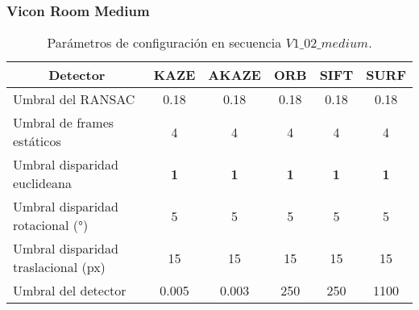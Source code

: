 \subsubsection{Vicon Room Medium}


\begin{table}[H]
	\caption{Parámetros de configuración  en secuencia $V1\_ 02\_ medium$.}
	\begin{tabular}{|l|c|c|c|c|c|}
		\hline
		\multicolumn{1}{|c|}{\textbf{Detector}} & \textbf{KAZE} & \textbf{AKAZE} & \textbf{ORB} & \textbf{SIFT} & \textbf{SURF} \\ \hline
		Umbral del RANSAC & 0.18 & 0.18 & 0.18 & 0.18 & 0.18 \\ \hline
		Umbral de frames estáticos & 4 & 4 & 4 & 4 & 4 \\ \hline
		Umbral disparidad euclideana & \textbf{1} & \textbf{1} & \textbf{1} & \textbf{1} & \textbf{1} \\ \hline
		Umbral disparidad rotacional (°) & 5 & 5 & 5 & 5 & 5 \\ \hline
		Umbral disparidad traslacional (px) & 15 & 15 & 15 & 15 & 15 \\ \hline
		Umbral del detector & 0.005 & 0.003 & 250 & 250 & 1100 \\ \hline
	\end{tabular}
	\label{Tabla/Parametros/V1_02_medium}
\end{table}

